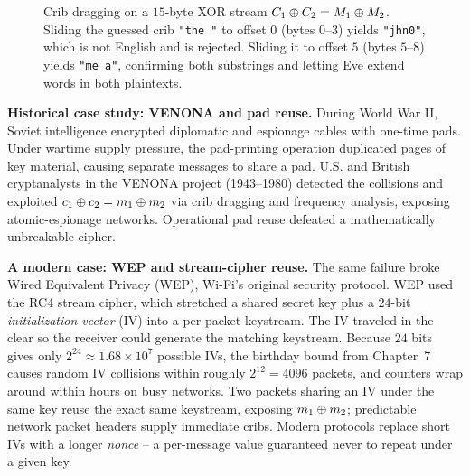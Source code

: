 \begin{figure}[htbp]
\caption{Crib dragging on a $15$-byte XOR stream $C_1 \oplus C_2 = M_1 \oplus M_2$. Sliding the guessed crib \texttt{"the~"} to offset $0$ (bytes $0$--$3$) yields \texttt{"jhn0"}, which is not English and is rejected. Sliding it to offset $5$ (bytes $5$--$8$) yields \texttt{"me~a"}, confirming both substrings and letting Eve extend words in both plaintexts.}
\label{ch09:fig-crib-dragging}
\end{figure}

\begin{attackbox}
\textbf{Historical case study: VENONA and pad reuse.} During World War II, Soviet intelligence encrypted diplomatic and espionage cables with one-time pads. Under wartime supply pressure, the pad-printing operation duplicated pages of key material, causing separate messages to share a pad. U.S. and British cryptanalysts in the VENONA project (1943--1980) detected the collisions and exploited $c_1 \oplus c_2 = m_1 \oplus m_2$ via crib dragging and frequency analysis, exposing atomic-espionage networks. Operational pad reuse defeated a mathematically unbreakable cipher.
\end{attackbox}

\begin{attackbox}
\textbf{A modern case: WEP and stream-cipher reuse.} The same failure broke Wired Equivalent Privacy (WEP), Wi-Fi's original security protocol. WEP used the RC4 stream cipher, which stretched a shared secret key plus a $24$-bit \emph{initialization vector} (IV) into a per-packet keystream. The IV traveled in the clear so the receiver could generate the matching keystream. Because $24$ bits gives only $2^{24} \approx 1.68 \times 10^7$ possible IVs, the birthday bound from Chapter~7 causes random IV collisions within roughly $2^{12} = 4096$ packets, and counters wrap around within hours on busy networks. Two packets sharing an IV under the same key reuse the exact same keystream, exposing $m_1 \oplus m_2$; predictable network packet headers supply immediate cribs. Modern protocols replace short IVs with a longer \emph{nonce} -- a per-message value guaranteed never to repeat under a given key.
\end{attackbox}

